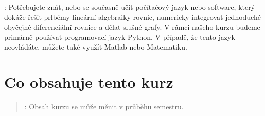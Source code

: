 \documentclass[letterpaper,10pt,english]{jupyterBook}
\begin{document}
\sphinxAtStartPar
{}: Potřebujete znát, nebo se současně učit počítačový jazyk nebo software, který dokáže řešit prlbémy lineární algebraiky
rovnic, numericky integrovat jednoduché obyčejné diferenciální rovnice a dělat slušné grafy. V rámci našeho kurzu budeme primárně používat programovací jazyk Python. V případě, že tento jazyk neovládáte, můžete také využít Matlab nebo Matematiku.


\chapter{Co obsahuje tento kurz}
\label{\detokenize{Prednasky/0_1_Definice_a_historie_mechaniky:co-obsahuje-tento-kurz}}\begin{quote}

\sphinxAtStartPar
{}: Obsah kurzu se může měnit  v průběhu semestru.
\end{quote}
\end{document}
